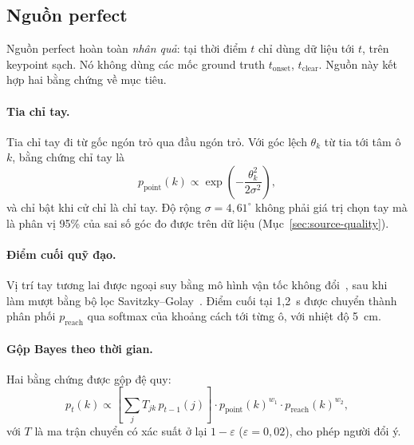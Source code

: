 \subsection{Nguồn perfect}

Nguồn perfect hoàn toàn \emph{nhân quả}: tại thời điểm $t$ chỉ dùng dữ liệu tới $t$, trên keypoint sạch. Nó không dùng các mốc ground truth $t_\text{onset}$, $t_\text{clear}$. Nguồn này kết hợp hai bằng chứng về mục tiêu.

\paragraph{Tia chỉ tay.} Tia chỉ tay đi từ gốc ngón trỏ qua đầu ngón trỏ. Với góc lệch $\theta_k$ từ tia tới tâm ô $k$, bằng chứng chỉ tay là
\begin{equation}
  p_\text{point}(k) \propto \exp\left(-\frac{\theta_k^2}{2\sigma^2}\right),
  \label{eq:point}
\end{equation}
và chỉ bật khi cử chỉ là chỉ tay. Độ rộng $\sigma = 4{,}61^\circ$ không phải giá trị chọn tay mà là phân vị 95\% của sai số góc đo được trên dữ liệu (Mục~\ref{sec:source-quality}).

\paragraph{Điểm cuối quỹ đạo.} Vị trí tay tương lai được ngoại suy bằng mô hình vận tốc không đổi~\cite{scholler2020cvm}, sau khi làm mượt bằng bộ lọc Savitzky--Golay~\cite{savitzky1964}. Điểm cuối tại 1,2~s được chuyển thành phân phối $p_\text{reach}$ qua softmax của khoảng cách tới từng ô, với nhiệt độ 5~cm.

\paragraph{Gộp Bayes theo thời gian.} Hai bằng chứng được gộp đệ quy:
\begin{equation}
  p_t(k) \propto \left[\textstyle\sum_j T_{jk}\, p_{t-1}(j)\right] \cdot p_\text{point}(k)^{w_1} \cdot p_\text{reach}(k)^{w_2},
  \label{eq:bayes}
\end{equation}
với $T$ là ma trận chuyển có xác suất ở lại $1-\varepsilon$ ($\varepsilon = 0{,}02$), cho phép người đổi ý.

